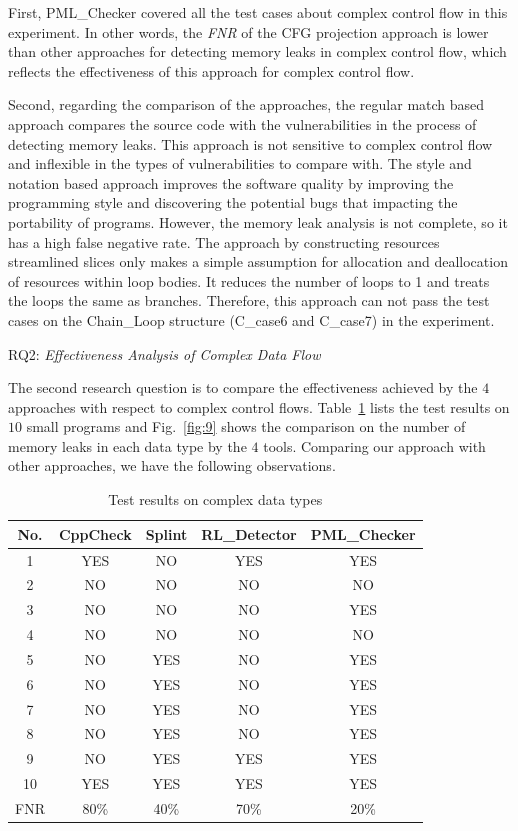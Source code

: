 First, PML\_Checker covered all the test cases about complex control flow in this experiment. In other words, the \textit{FNR} of the CFG projection approach is lower than other approaches for detecting memory leaks in complex control flow, which reflects the effectiveness of this approach for complex control flow.

Second, regarding the comparison of the approaches, the regular match based approach compares the source code with the vulnerabilities in the process of detecting memory leaks. This approach is not sensitive to complex control flow and inflexible in the types of vulnerabilities to compare with. The style and notation based approach improves the software quality by improving the programming style and discovering the potential bugs that impacting the portability of programs. However, the memory leak analysis is not complete, so it has a high false negative rate. The approach by constructing resources streamlined slices only makes a simple assumption for allocation and deallocation of resources within loop bodies. It reduces the number of loops to 1 and treats the loops the same as branches. Therefore, this approach can not pass the test cases on the Chain\_Loop structure (C\_case6 and C\_case7) in the experiment.

\noindent RQ2: \textit{Effectiveness Analysis of Complex Data Flow}

The second research question is to compare the effectiveness achieved by the $4$ approaches with respect to complex control flows. Table~\ref{tab:3} lists the test results on $10$ small programs and Fig.~\ref{fig:9} shows the comparison on the number of  memory leaks in each data type by the $4$ tools. Comparing our approach with other approaches, we have the following observations.

\begin{table}[!h]
\center
\caption{Test results on complex data types}\label{tab:3}
\begin{tabular}{|c|c|c|c|c|}
\hline
\textbf{No.}  & \textbf{CppCheck} & \textbf{Splint} & \textbf{RL\_Detector} & \textbf{PML\_Checker}\\
\hline
1	 &	YES & NO & YES & YES\\
\hline
2  & NO & NO & NO & NO \\
\hline
3	 & NO &	NO & NO & YES\\
\hline
4		& NO &	NO & NO & NO\\
\hline
5	 & NO & YES & NO & YES\\
\hline
6	 &	NO	& YES & NO & YES\\
\hline
7	 & NO & YES & NO & YES\\
\hline
8	 & NO & YES & NO & YES\\
\hline
9	 & NO & YES & YES & YES\\
\hline
10  & YES & YES & YES & YES\\
\hline
FNR & 80\% & 40\% & 70\% & 20\%\\
\hline
\end{tabular}
\end{table}

